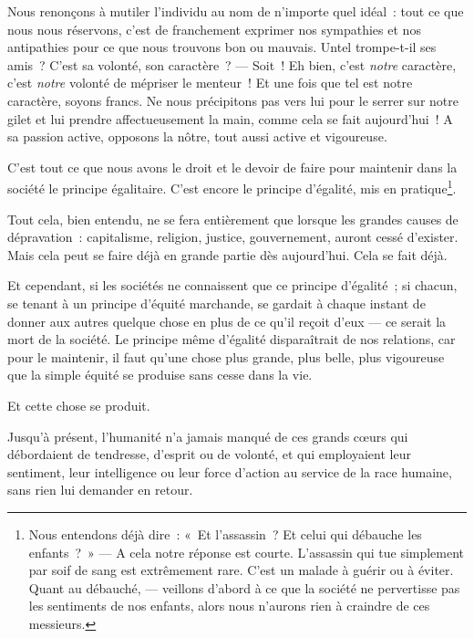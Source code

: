 \documentclass[french,twoside]{book} %
\begin{document}
\bigbreak
\noindent Nous renonçons à mutiler l’individu au nom de n’importe quel idéal : tout ce que nous nous réservons, c’est de franchement exprimer nos sympathies et nos antipathies pour ce que nous trouvons bon ou mauvais. Untel trompe-t-il ses amis ? C’est sa volonté, son caractère ? — Soit ! Eh bien, c’est \emph{notre} caractère, c’est \emph{notre} volonté de mépriser le menteur ! Et une fois que tel est notre caractère, soyons francs. Ne nous précipitons pas vers lui pour le serrer sur notre gilet et lui prendre affectueusement la main, comme cela se fait aujourd’hui ! A sa passion active, opposons la nôtre, tout aussi active et vigoureuse.\par
C’est tout ce que nous avons le droit et le devoir de faire pour maintenir dans la société le principe égalitaire. C’est encore le principe d’égalité, mis en pratique\footnote{ \noindent Nous entendons déjà dire : « Et l’assassin ? Et celui qui débauche les enfants ? » — A cela notre réponse est courte. L’assassin qui tue simplement par soif de sang est extrêmement rare. C’est un malade à guérir ou à éviter. Quant au débauché, — veillons d’abord à ce que la société ne pervertisse pas les sentiments de nos enfants, alors nous n’aurons rien à craindre de ces messieurs.
 }.\par
Tout cela, bien entendu, ne se fera entièrement que lorsque les grandes causes de dépravation : capitalisme, religion, justice, gouvernement, auront cessé d’exister. Mais cela peut se faire déjà en grande partie dès aujourd’hui. Cela se fait déjà.\par
\bigbreak
\noindent Et cependant, si les sociétés ne connaissent que ce principe d’égalité ; si chacun, se tenant à un principe d’équité marchande, se gardait  à chaque instant de donner aux autres quelque chose en plus de ce qu’il reçoit d’eux — ce serait la mort de la société. Le principe même d’égalité disparaîtrait de nos relations, car pour le maintenir, il faut qu’une chose plus grande, plus belle, plus vigoureuse que la simple équité se produise sans cesse dans la vie.\par
Et cette chose se produit.\par
\bigbreak
\noindent Jusqu’à présent, l’humanité n’a jamais manqué de ces grands cœurs qui débordaient de tendresse, d’esprit ou de volonté, et qui employaient leur sentiment, leur intelligence ou leur force d’action au service de la race humaine, sans rien lui demander en retour.\par
\end{document}
